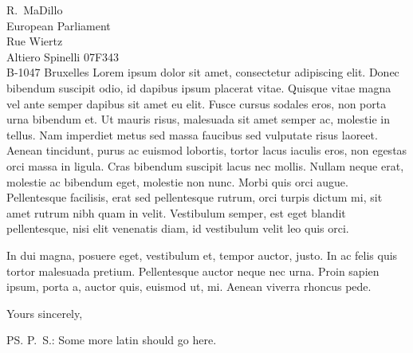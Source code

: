 \documentclass[a4paper,12pt]{letter}
\begin{document}
\begin{letter}{
	R.\ MaDillo\\
	European Parliament\\
	Rue Wiertz\\
	Altiero Spinelli 07F343\\
	B-1047 Bruxelles 
}
	Lorem ipsum dolor sit amet, consectetur adipiscing elit. Donec bibendum 
	suscipit odio, id dapibus ipsum placerat vitae. Quisque vitae magna vel ante 
	semper dapibus sit amet eu elit. Fusce cursus sodales eros, non porta urna 
	bibendum et. Ut mauris risus, malesuada sit amet semper ac, molestie in 
	tellus. Nam imperdiet metus sed massa faucibus sed vulputate risus laoreet. 
	Aenean tincidunt, purus ac euismod lobortis, tortor lacus iaculis eros, non 
	egestas orci massa in ligula. Cras bibendum suscipit lacus nec mollis. Nullam 
	neque erat, molestie ac bibendum eget, molestie non nunc. Morbi quis orci 
	augue. Pellentesque facilisis, erat sed pellentesque rutrum, orci turpis 
	dictum mi, sit amet rutrum nibh quam in velit. Vestibulum semper, est eget 
	blandit pellentesque, nisi elit venenatis diam, id vestibulum velit leo quis 
	orci. 

	In dui magna, posuere eget, vestibulum et, tempor auctor, justo. In ac felis 
	quis tortor malesuada pretium. Pellentesque auctor neque nec urna. Proin 
	sapien ipsum, porta a, auctor quis, euismod ut, mi. Aenean viverra rhoncus 
	pede. 

%
%

%
%
\closing{Yours sincerely,} %
\ps{P.\ S.: Some more latin should go here.} %

%
%

\vspace{1cm}
\begingroup
\def\enotesize{\small}
\def\enoteheading{\Large \textsc{Notes}}
\theendnotes
\endgroup

\end{letter}
\end{document}
